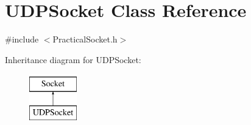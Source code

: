 \hypertarget{class_u_d_p_socket}{}\section{U\+D\+P\+Socket Class Reference}
\label{class_u_d_p_socket}


{\ttfamily \#include $<$Practical\+Socket.\+h$>$}

Inheritance diagram for U\+D\+P\+Socket\+:\begin{figure}[H]
\begin{center}
\leavevmode
\includegraphics[height=2.000000cm]{class_u_d_p_socket}
\end{center}
\end{figure}
